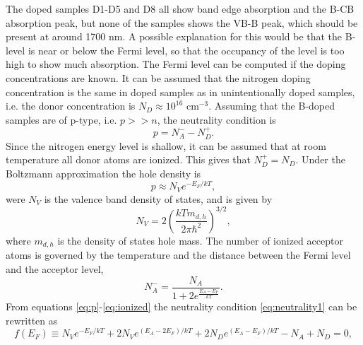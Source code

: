 The doped samples D1-D5 and D8 all show band edge absorption and the B-CB absorption peak, but none of the samples shows the VB-B peak, which should be present at around 1700 nm. A possible explanation for this would be that the B-level is near or below the Fermi level, so that the occupancy of the level is too high to show much absorption. The Fermi level can be computed if the doping concentrations are known. It can be assumed that the nitrogen doping concentration is the same in doped samples as in unintentionally doped samples, i.e. the donor concentration is $N_D \approx 10^{16}$ cm$^{-3}$. Assuming that the B-doped samples are of p-type, i.e. $p>>n$, the neutrality condition is
\begin{equation}
\label{eq:neutrality1}
p = N_A^- - N_D^+.
\end{equation}
Since the nitrogen energy level is shallow, it can be assumed that at room temperature all donor atoms are ionized. This gives that $N_D^+ =N_D$. Under the Boltzmann approximation the hole density is
\begin{equation}
\label{eq:p}
p \approx N_Ve^{-E_F/kT},
\end{equation}
were $N_V$ is the valence band density of states, and is given by
\begin{equation}
\label{eq:nv}
N_V = 2\left(\frac{kTm_{d,h}}{2\pi \hbar^2}\right)^{3/2},
\end{equation}
where $m_{d,h}$ is the density of states hole mass. The number of ionized acceptor atoms is governed by the temperature and the distance between the Fermi level and the acceptor level, 
\begin{equation}
\label{eq:ionized}
N_A^- = \frac{N_A}{1+2e^{\frac{E_A-E_F}{kT}}}.
\end{equation}
From equations \ref{eq:p}-\ref{eq:ionized} the neutrality condition \ref{eq:neutrality1} can be rewritten as
\begin{equation}
\label{eq:neutrality2}
f(E_F) \equiv N_Ve^{-E_F/kT}+2N_Ve^{(E_A-2E_F)/kT}+2N_De^{(E_A-E_F)/kT} - N_A + N_D = 0,
\end{equation}
